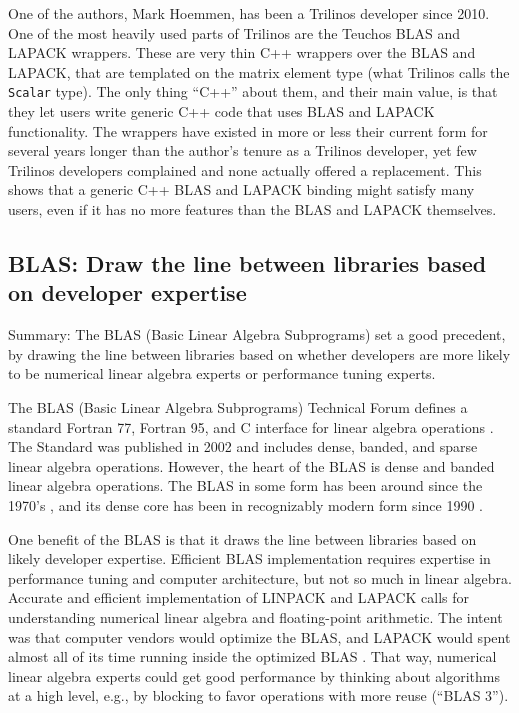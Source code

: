 One of the authors, Mark Hoemmen, has been a Trilinos
\cite{heroux2005trilinos} developer since 2010.  One of the most
heavily used parts of Trilinos are the Teuchos BLAS and LAPACK
wrappers.  These are very thin C++ wrappers over the BLAS and LAPACK,
that are templated on the matrix element type (what Trilinos calls the
\texttt{Scalar} type).  The only thing ``C++'' about them, and their
main value, is that they let users write generic C++ code that uses
BLAS and LAPACK functionality.  The wrappers have existed in more or
less their current form for several years longer than the author's
tenure as a Trilinos developer, yet few Trilinos developers complained
and none actually offered a replacement.  This shows that a generic
C++ BLAS and LAPACK binding might satisfy many users, even if it has
no more features than the BLAS and LAPACK themselves.

\subsection{BLAS: Draw the line between libraries
  based on developer expertise}
\label{SS:other-langs:BLAS}

Summary: The BLAS (Basic Linear Algebra Subprograms) set a good
precedent, by drawing the line between libraries based on whether
developers are more likely to be numerical linear algebra experts or
performance tuning experts.

The BLAS (Basic Linear Algebra Subprograms) Technical Forum defines a
standard Fortran 77, Fortran 95, and C interface for linear algebra
operations \cite{BLAS-standard}.  The Standard was published in 2002
and includes dense, banded, and sparse linear algebra operations.
However, the heart of the BLAS is dense and banded linear algebra
operations.  The BLAS in some form has been around since the 1970's
\cite{lawson1979blas,dongarra2005history}, and its dense core has been
in recognizably modern form since 1990 \cite{dongarra1990blas3}.

One benefit of the BLAS is that it draws the line between libraries
based on likely developer expertise.  Efficient BLAS implementation
requires expertise in performance tuning and computer architecture,
but not so much in linear algebra.  Accurate and efficient
implementation of LINPACK and LAPACK calls for understanding numerical
linear algebra and floating-point arithmetic.  The intent was that
computer vendors would optimize the BLAS, and LAPACK would spent
almost all of its time running inside the optimized BLAS \cite[``The
BLAS as the Key to Portability'']{LAPACK-Users-Guide}.  That way,
numerical linear algebra experts could get good performance by
thinking about algorithms at a high level, e.g., by blocking to favor
operations with more reuse (``BLAS 3'').

